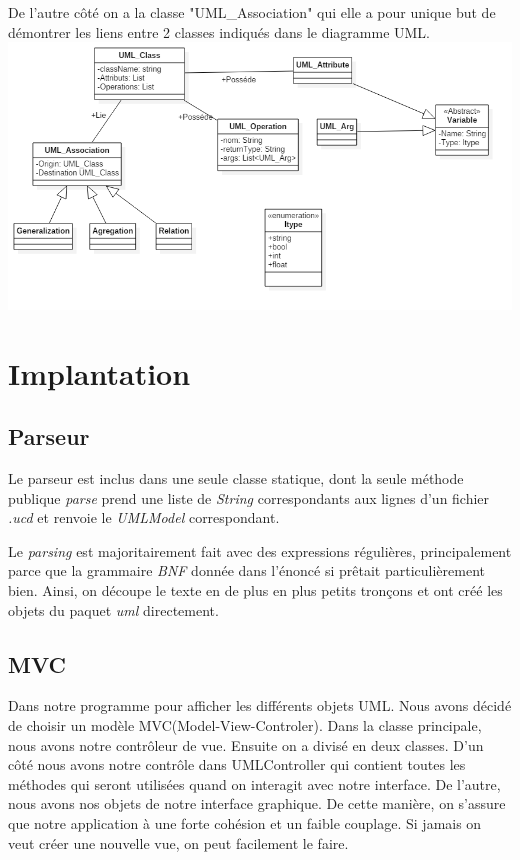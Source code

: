 \documentclass[letter,french]{report}
\begin{document}
	De l'autre côté on a la
	classe "UML\_Association" qui elle a pour unique but de démontrer les liens
	entre 2 classes indiqués dans le diagramme UML.
	\newline
	\includegraphics[scale=.4]{DiagrammeClasse.png}
	
	\section*{Implantation}
	
	\subsection*{Parseur}
	Le parseur est inclus dans une seule classe statique, dont la seule méthode
	publique \emph{parse} prend une liste de \emph{String} correspondants aux lignes d'un
	fichier \emph{.ucd} et renvoie le \emph{UMLModel} correspondant. 
	
	Le \emph{parsing} est majoritairement fait avec des expressions régulières,
	principalement parce que la grammaire \emph{BNF} donnée dans l'énoncé si
	prêtait particulièrement bien. Ainsi, on découpe le texte en de plus en plus
	petits tronçons et ont créé les objets du paquet \emph{uml} directement.
	
	\subsection*{MVC}
	Dans notre programme pour afficher les différents objets UML. Nous avons décidé de choisir un modèle MVC(Model-View-Controler). Dans la classe principale, nous avons notre contrôleur de vue. Ensuite on a divisé en deux classes. D’un côté nous avons notre contrôle dans UMLController qui contient toutes les méthodes qui seront utilisées quand on interagit avec notre interface. De l’autre, nous avons nos objets de notre interface graphique. De cette manière, on s’assure que notre application à une forte cohésion et un faible couplage. Si jamais on veut créer une nouvelle vue, on peut facilement le faire.
	
\end{document}
